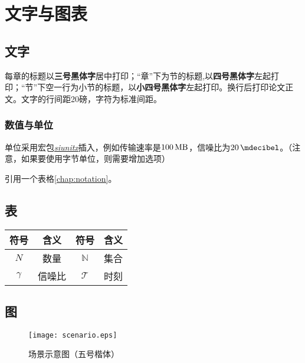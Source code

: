 \chapter{文字与图表}
\section{文字}
每章的标题以\textbf{三号黑体字}居中打印；“章”下为节的标题,以\textbf{四号黑体字}左起打印；“节”下空一行为小节的标题，以\textbf{小四号黑体字}左起打印。换行后打印论文正文。文字的行间距20磅，字符为标准间距。

\subsection{数值与单位}

单位采用宏包\href{http://mirrors.sjtug.sjtu.edu.cn/ctan/macros/latex/contrib/siunitx/siunitx.pdf}{\textit{siunitx}}插入，例如传输速率是$\SI{100}{\mega\byte}$，信噪比为$\SI{20}{\mdecibel}$。（注意，如果要使用字节单位，则需要增加选项） 

引用一个表格\ref{chap:notation}。

\section{表}

\begin{table*}[!htb]
	\centering
	\caption{数学符号含义表（标题及序号置于表的正上方）}
	\label{chap:notation}
	\begin{tabular}{|c|c||c|c|}
		\hline
		\rowcolor{LightSteelBlue}
		\textbf{符号} 			& \textbf{含义} 	    & \textbf{符号}		  & \textbf{含义} 		   	 \\
		\hline
		$N$ 					 & 数量		   		 & $\mathbb{N}$ 		 & 集合 						\\
		\hline
		$\gamma$ 				 & 信噪比			    & $\mathcal{T}$ 		& 时刻		 			   \\
		\hline
	\end{tabular}
\end{table*}

\section{图}

\begin{figure}
	\centering
	\texttt{[image: scenario.eps]}
	\caption{场景示意图（五号楷体）}
	\label{chap:scenario}
\end{figure}

